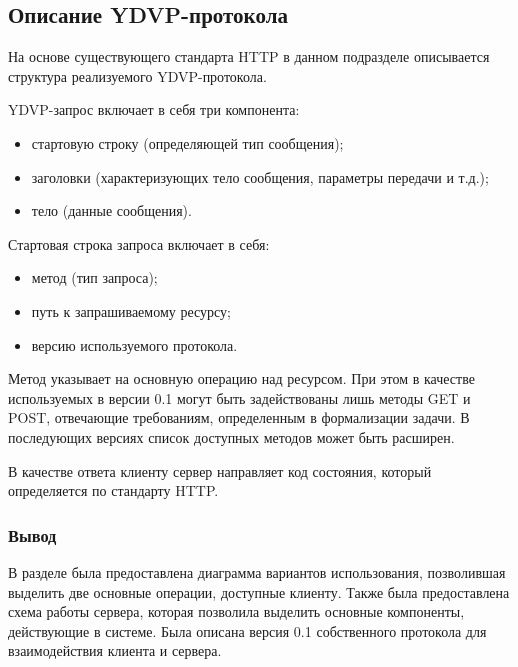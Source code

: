 \subsection{Описание YDVP-протокола}
На основе существующего стандарта HTTP в данном подразделе описывается структура реализуемого YDVP-протокола.

YDVP-запрос включает в себя три компонента:
\begin{itemize}[leftmargin=1.6\parindent]
\item стартовую строку (определяющей тип сообщения);
\item заголовки (характеризующих тело сообщения, параметры передачи и т.д.);
\item тело (данные сообщения).
\end{itemize}

Стартовая строка запроса включает в себя:
\begin{itemize}[leftmargin=1.6\parindent]
\item метод (тип запроса);
\item путь к запрашиваемому ресурсу;
\item версию используемого протокола.
\end{itemize}

Метод указывает на основную операцию над ресурсом. При этом в качестве используемых в версии 0.1 могут быть задействованы лишь методы GET и POST, отвечающие требованиям, определенным в формализации задачи. В последующих версиях список доступных методов может быть расширен.

В качестве ответа клиенту сервер направляет код состояния, который определяется по стандарту HTTP.

\subsubsection*{Вывод}
В разделе была предоставлена диаграмма вариантов использования, позволившая выделить две основные операции, доступные клиенту. Также была предоставлена схема работы сервера, которая позволила выделить основные компоненты, действующие в системе. Была описана версия 0.1 собственного протокола для взаимодействия клиента и сервера.

\pagebreak